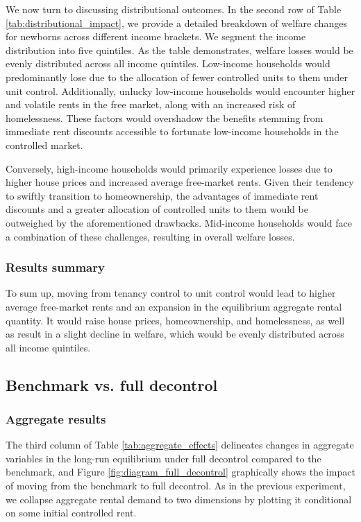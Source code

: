 \documentclass[parskip=full]{article}
\begin{document}
We now turn to discussing distributional outcomes. In the second row of Table \ref{tab:distributional_impact}, we provide a detailed breakdown of welfare changes for newborns across different income brackets. We segment the income distribution into five quintiles. As the table demonstrates, welfare losses would be evenly distributed across all income quintiles. Low-income households would predominantly lose due to the allocation of fewer controlled units to them under unit control. Additionally, unlucky low-income households would encounter higher and volatile rents in the free market, along with an increased risk of homelessness. These factors would overshadow the benefits stemming from immediate rent discounts accessible to fortunate low-income households in the controlled market. 

Conversely, high-income households would primarily experience losses due to higher house prices and increased average free-market rents. Given their tendency to swiftly transition to homeownership, the advantages of immediate rent discounts and a greater allocation of controlled units to them would be outweighed by the aforementioned drawbacks. Mid-income households would face a combination of these challenges, resulting in overall welfare losses.

\subsubsection{Results summary}

To sum up, moving from tenancy control to unit control would lead to higher average free-market rents and an expansion in the equilibrium aggregate rental quantity. It would raise house prices, homeownership, and homelessness, as well as result in a slight decline in welfare, which would be evenly distributed across all income quintiles. 

\subsection{Benchmark vs. full decontrol}

\subsubsection{Aggregate results}

The third column of Table \ref{tab:aggregate_effects} delineates changes in aggregate variables in the long-run equilibrium under full decontrol compared to the benchmark, and Figure \ref{fig:diagram_full_decontrol} graphically shows the impact of moving from the benchmark to full decontrol. As in the previous experiment, we collapse aggregate rental demand to two dimensions by plotting it conditional on some initial controlled rent.
\end{document}
